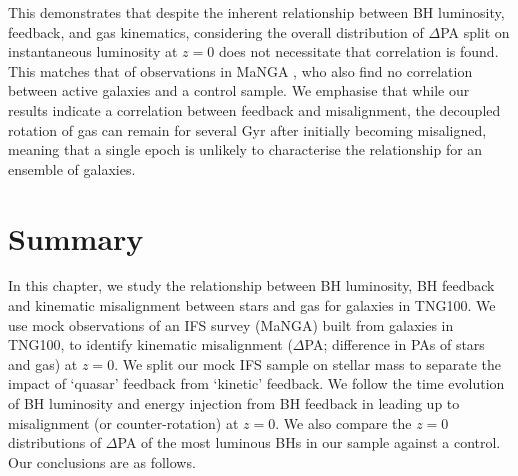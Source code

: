 This demonstrates that despite the inherent relationship between BH luminosity, feedback, and gas kinematics, considering the overall distribution of $\Delta$PA split on instantaneous luminosity at $z=0$ does not necessitate that correlation is found. This matches that of observations in MaNGA \citep[Figure 6 in][]{ilha2019}, who also find no correlation between active galaxies and a control sample. We emphasise that while our results indicate a correlation between feedback and misalignment, the decoupled rotation of gas can remain for several Gyr after initially becoming misaligned, meaning that a single epoch is unlikely to characterise the relationship for an ensemble of galaxies.

\section{Summary} \label{sec:summary_BH}
In this chapter, we study the relationship between BH luminosity, BH feedback and kinematic misalignment between stars and gas for galaxies in TNG100. We use mock observations of an IFS survey (MaNGA) built from galaxies in TNG100, to identify kinematic misalignment ($\Delta$PA; difference in PAs of stars and gas) at $z=0$. We split our mock IFS sample on stellar mass to separate the impact of `quasar' feedback from `kinetic' feedback. We follow the time evolution of BH luminosity and energy injection from BH feedback in leading up to misalignment (or counter-rotation) at $z=0$. We also compare the $z=0$ distributions of $\Delta$PA of the most luminous BHs in our sample against a control. Our conclusions are as follows.
